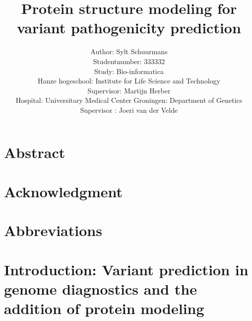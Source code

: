 \documentclass[10pt]{article}
\begin{document}
	\title{Protein structure modeling for variant pathogenicity prediction}
	\author{Author: Sylt Schuurmans\\
		Studentnumber: 333332\\
		Study: Bio-informatica\\
		Hanze hogeschool: Institute for Life Science and Technology\\
		Supervisor: Martijn Herber\\
		Hospital: Universitary Medical Center Groningen: Department of Genetics\\
		Supervisor : Joeri van der Velde}
	\maketitle
	\newpage
	
	
	\section*{Abstract}
	
	\label{section:Chap_Introduction}
	\newpage
	
	\section*{Acknowledgment}
	
	\newpage
	
	\section*{Abbreviations}
	
	\label{section:Chap_Abbreviations}
	\newpage
	
	\tableofcontents
	\newpage
	
	\listoffigures
	\newpage
	
	\listoftables
	\newpage
	
	\section[Introduction]{Introduction: Variant prediction in genome diagnostics and the addition of protein modeling}
	
	\label{section:Chap_Variant_Prediction_In_Genome_Diagnostics}
	\newpage
	
\end{document}
